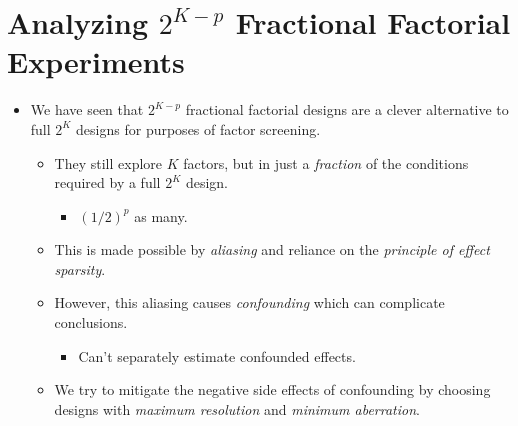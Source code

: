 \section{Analyzing \texorpdfstring{$ 2^{K-p} $}{2K-p} Fractional Factorial Experiments}
\begin{itemize}[*]
      \item We have seen that $2^{K-p}$ fractional factorial designs are a clever alternative to full $2^K$ designs for
            purposes of factor screening.
            \begin{itemize}
                  \item They still explore $K$ factors, but in just a \emph{fraction} of the conditions required by a full $2^K$ design.
                        \begin{itemize}[$\hookrightarrow$]
                              \item $ (1/2)^p $ as many.
                        \end{itemize}
                  \item This is made possible by \emph{aliasing} and reliance on the \emph{principle of effect sparsity}.
                  \item However, this aliasing causes \emph{confounding} which can complicate conclusions.
                        \begin{itemize}[$\hookrightarrow$]
                              \item Can't separately estimate confounded effects.
                        \end{itemize}
                  \item We try to mitigate the negative side effects of confounding by choosing designs with \emph{maximum resolution} and \emph{minimum aberration}.
            \end{itemize}
\end{itemize}
